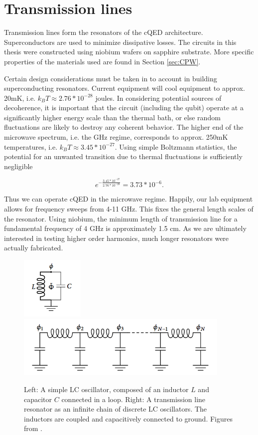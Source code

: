 \documentclass[11 pt, oneside]{book} %
\begin{document}
\section{Transmission lines}\label{sec:TransmissionLines}
Transmission lines form the resonators of the cQED architecture. Superconductors are used to minimize dissipative losses. The circuits in this thesis were constructed using niobium wafers on sapphire substrate.  More specific properties of the materials used are found in Section \ref{sec:CPW}. 

Certain design considerations must be taken in to account in building superconducting resonators. Current equipment will cool equipment  to approx. 20mK, i.e. $k_BT\approx2.76*10^{-28}$ joules. In considering potential sources of decoherence, it is important that the circuit (including the qubit) operate at a significantly higher energy scale than the thermal bath, or else random fluctuations are likely to destroy any coherent behavior. The higher end of the microwave spectrum, i.e. the GHz regime, corresponds to approx. 250mK temperatures, i.e. $k_BT\approx3.45*10^{-27}$. Using simple Boltzmann statistics, the potential for an unwanted transition due to thermal fluctuations is sufficiently negligible

\begin{equation}
e^{-\frac{3.45*10^{-27}}{2.76*10^{-28}}}=3.73*10^{-6}.
\end{equation}

Thus we can operate cQED in the microwave regime. Happily, our lab equipment allows for frequency sweeps from 4-11 GHz. This fixes the general length scales of the resonator. Using niobium, the minimum length of transmission line for a fundamental frequency of 4 GHz is approximately 1.5 cm. As we are ultimately interested in testing higher order harmonics, much longer resonators were actually fabricated. 

\begin{figure}[h] 
   \centering
   \includegraphics[height=3cm]{BishopLC.png} \includegraphics[height=3cm]{BishopLCChain.png} 
   \caption[LC oscillator]{Left: A simple LC oscillator, composed of an inductor $L$ and capacitor $C$ connected in a loop. Right: A transmission line resonator as an infinite chain of discrete LC oscillators. The inductors are coupled and capacitively connected to ground. Figures from \cite{Bishop}.}
   \label{fig:LCOscillator}
\end{figure}
\end{document}
